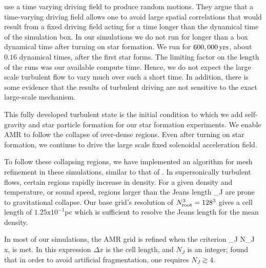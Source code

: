 \documentclass[../dissertation.tex]{subfiles}
\begin{document}
\citet{2012ApJ...761..156F} use a time varying driving field to produce random motions.  They argue that a time-varying driving field allows one to avoid large spatial correlations that would result from a fixed driving field acting for a time longer than the dynamical time of the simulation box. 
In our simulations we do not run for longer than a box dynamical time after turning on star formation. 
We run for $600,000  \, {\rm yrs}$, about $0.16$ dynamical times, after the first star forms.
The limiting factor on the length of the runs was our available compute time.
Hence, we do not expect the large scale turbulent flow to vary much over such a short time.
In addition, there is some evidence \citep{2010A&A...512A..81F} that the results of turbulent driving are not sensitive to the exact large-scale mechanism.
 

This fully developed turbulent state is the initial condition to 
which we add self-gravity and star particle formation for our star 
formation experiments. We enable AMR to follow the collapse of over-dense regions.
Even after turning on star formation, we continue to drive the large scale fixed solenoidal acceleration field.


To follow these collapsing regions, we have implemented an algorithm 
for mesh refinement in these simulations, similar to that of \citet{2010ApJ...713..269F}.
In supersonically turbulent flows, certain regions rapidly increase in density.
For a given density and temperature, or sound speed, regions larger than the 
Jeans length
%
\be
\lambda_J \equiv {}  
\label{eq:hydro_Jeans_length}
\ee
%
are prone to gravitational collapse. Our base grid's resolution of $N_{\rm root}^3 = 128^3$ 
gives a cell length of 
$1.25 \text{x} 10^{-1}$pc which is sufficient to resolve the Jeans 
length for the mean density.

In most of our simulations, the AMR grid is refined when the \citet{1997ApJ...489L.179T} criterion 
%
\be
\lambda_J \ge N_J \Delta x, 
\ee
%
is met.
In this expression $\Delta x$ is the cell length, and $N_J$ is an integer; \citet{1997ApJ...489L.179T} found that in order to avoid artificial fragmentation, one requires $N_J\gtrsim 4$.
\end{document}
